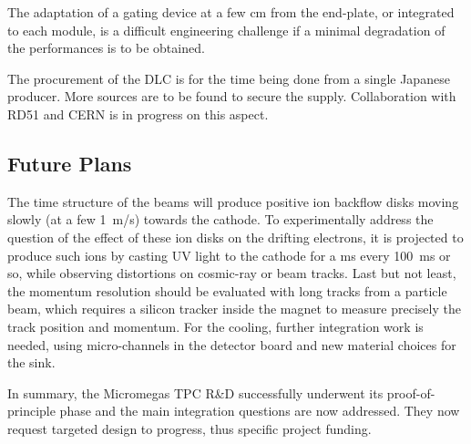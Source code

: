 The adaptation of a gating device at a few cm from the end-plate, or integrated to each module, is a
difficult engineering challenge if a minimal degradation of the performances is to be obtained.

The procurement of the DLC is for the time being done from a single Japanese producer. More sources are to be found to secure the supply. Collaboration with RD51 and CERN is in progress on this aspect. 

\subsection{Future Plans}
The time structure of the beams will produce positive ion backflow disks moving slowly (at a few \SI{1}{m/s}) towards the cathode. To experimentally address the question of the effect of these ion disks on the drifting electrons, it is projected to produce such
ions by casting UV light to the cathode for a ms every \SI{100}{ms} or so, while observing distortions on cosmic-ray or beam tracks.
Last but not least, the momentum resolution should be evaluated with long tracks from a particle beam, which requires a silicon
tracker inside the magnet to measure precisely the track position and momentum. For the cooling, further integration work is needed, using micro-channels in the detector board and new material choices for the sink.

In summary, the Micromegas TPC R\&D successfully underwent its proof-of-principle phase and the main integration questions are now addressed. They now request targeted design to progress, thus specific project funding.
